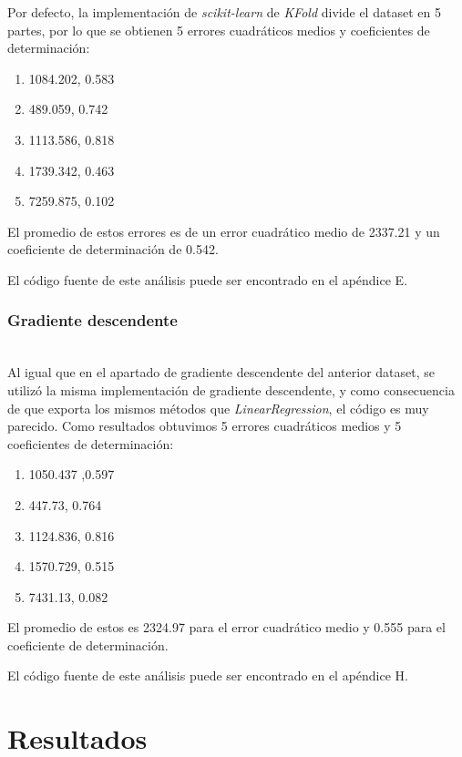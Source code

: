 \documentclass[sigconf,authorversion,nonacm]{acmart}
\begin{document}
Por defecto, la implementación de \textit{scikit-learn} de \textit{KFold} divide el dataset en 5 partes\cite{scikit-learn}, por lo que se obtienen 5 errores cuadráticos medios y coeficientes de determinación:
\begin{enumerate}
  \item 1084.202, 0.583
  \item  489.059, 0.742
  \item 1113.586, 0.818
  \item 1739.342, 0.463
  \item 7259.875, 0.102
\end{enumerate}
El promedio de estos errores es de un error cuadrático medio de 2337.21 y un coeficiente de determinación de 0.542.

El código fuente de este análisis puede ser encontrado en el apéndice E.

\subsubsection{Gradiente descendente}\hfill\\
Al igual que en el apartado de gradiente descendente del anterior dataset, se utilizó la misma implementación de gradiente descendente, y como consecuencia de que exporta los mismos métodos que \textit{LinearRegression}, el código es muy parecido.
Como resultados obtuvimos 5 errores cuadráticos medios y 5 coeficientes de determinación:
\begin{enumerate}
  \item 1050.437 ,0.597
  \item 447.73, 0.764
  \item 1124.836, 0.816
  \item 1570.729, 0.515
  \item 7431.13, 0.082
\end{enumerate}
El promedio de estos es 2324.97 para el error cuadrático medio y 0.555 para el coeficiente de determinación.

El código fuente de este análisis puede ser encontrado en el apéndice H.


\section{Resultados}
\end{document}
